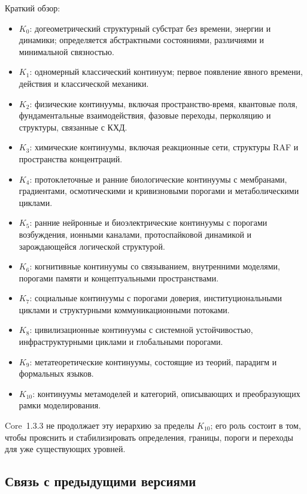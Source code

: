 Краткий обзор:

\begin{itemize}
    \item \(K_0\): догеометрический структурный субстрат без времени, энергии и динамики; определяется абстрактными состояниями, различиями и минимальной связностью.
    \item \(K_1\): одномерный классический континуум; первое появление явного времени, действия и классической механики.
    \item \(K_2\): физические континуумы, включая пространство-время, квантовые поля, фундаментальные взаимодействия, фазовые переходы, перколяцию и структуры, связанные с КХД.
    \item \(K_3\): химические континуумы, включая реакционные сети, структуры RAF и пространства концентраций.
    \item \(K_4\): протоклеточные и ранние биологические континуумы с мембранами, градиентами, осмотическими и кривизновыми порогами и метаболическими циклами.
    \item \(K_5\): ранние нейронные и биоэлектрические континуумы с порогами возбуждения, ионными каналами, протоспайковой динамикой и зарождающейся логической структурой.
    \item \(K_6\): когнитивные континуумы со связыванием, внутренними моделями, порогами памяти и концептуальными пространствами.
    \item \(K_7\): социальные континуумы с порогами доверия, институциональными циклами и структурными коммуникационными потоками.
    \item \(K_8\): цивилизационные континуумы с системной устойчивостью, инфраструктурными циклами и глобальными порогами.
    \item \(K_9\): метатеоретические континуумы, состоящие из теорий, парадигм и формальных языков.
    \item \(K_{10}\): континуумы метамоделей и категорий, описывающих и преобразующих рамки моделирования.
\end{itemize}

Core~1.3.3 не продолжает эту иерархию за пределы \(K_{10}\); его роль состоит в том, чтобы прояснить и стабилизировать определения, границы, пороги и переходы для уже существующих уровней.

\subsection{Связь с предыдущими версиями}

